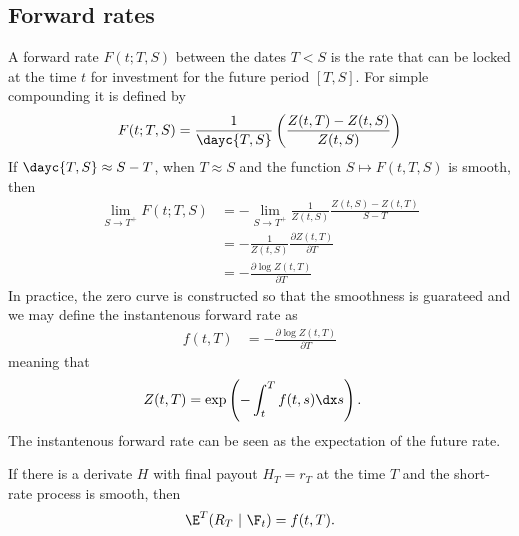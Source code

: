 \subsection{Forward rates}

A forward rate $F(t;T,S)$ between the dates $T < S$ is the rate that can be locked at the time $t$ for investment for the future period $[T,S]$. For simple compounding it is defined by
  \begin{align}
    F(t;T,S) = \frac{1}{\dayc{T,S}} \left( \frac{Z(t,T) - Z(t,S) }{Z(t,S)} \right)
  \end{align}
If $\dayc{T,S} \approx S-T$, when $T \approx S$ and the function $S \mapsto F(t,T,S)$ is smooth, then
  \begin{align}
    \lim_{S \rightarrow T^+} F(t;T,S) &= - \lim_{S \rightarrow T^+} \frac{1}{Z(t,S)} \frac{Z(t,S) - Z(t,T)}{S-T} \\
      &= - \frac{1}{Z(t,S)} \frac{\partial Z(t,T) }{\partial T} \\
      &= - \frac{\partial \log Z(t,T) }{\partial T}
  \end{align}
In practice, the zero curve is constructed so that the smoothness is guarateed and we may define the instantenous forward rate as
  \begin{align}
    f(t,T) &= - \frac{\partial \log Z(t,T) }{\partial T}
  \end{align}
meaning that
  \begin{align}
    Z(t,T) &= \exp \left( - \int_t^T f(t,s) \dx s \right) .
  \end{align}
The instantenous forward rate can be seen as the expectation of the future rate.

\begin{thm}
  \label{expectedforwardrate}
If there is a derivate $H$ with final payout $H_T = r_T$ at the time $T$ and the short-rate process is smooth, then
  \begin{align}
    \E^T ( R_T \ | \ \F_t ) = f(t,T) .
  \end{align}
\end{thm}

